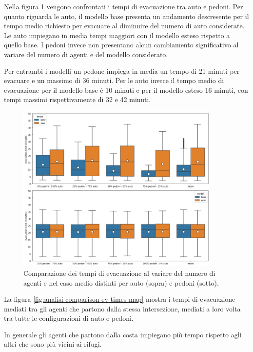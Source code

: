 Nella figura \ref{fig:analisi-comparison-evtimes2} vengono confrontati i tempi di evacuazione tra auto e pedoni.
Per quanto riguarda le auto, il modello base presenta un andamento descresente per il tempo medio richiesto per evacuare al diminuire del numero di auto considerate.
Le auto impiegano in media tempi maggiori con il modello esteso rispetto a quello base.
%
I pedoni invece non presentano alcun cambiamento significativo al variare del numero di agenti e del modello considerato. 

Per entrambi i modelli un pedone impiega in media un tempo di 21 minuti per evacuare e un massimo di 36 minuti.
Per le auto invece il tempo medio di evacuazione per il modello base è 10 minuti e per il modello esteso 16 minuti, 
con tempi massimi rispettivamente di 32 e 42 minuti.

\begin{figure}[ht]
    \centering
    \includegraphics[width=0.9\textwidth]{images/analisi/comparison-evtimes2.png}
    \caption{
        Comparazione dei tempi di evacuazione al variare del numero di agenti e nel caso medio distinti per auto (sopra) e pedoni (sotto).
    }
    \label{fig:analisi-comparison-evtimes2}
\end{figure}

\pagebreak

La figura \ref{fig:analisi-comparison-ev-times-map} mostra i tempi di evacuazione mediati tra gli agenti che partono dalla stessa intersezione,
mediati a loro volta tra tutte le configurazioni di auto e pedoni.

In generale gli agenti che partono dalla costa impiegano più tempo rispetto agli altri che sono più vicini ai rifugi.

